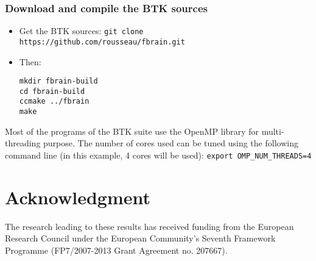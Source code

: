\documentclass[a4paper,10pt]{article}
\begin{document}
\subsubsection{Download and compile the BTK sources}
\begin{itemize}
 \item Get the BTK sources: \texttt{git clone https://github.com/rousseau/fbrain.git }
 \item Then:
\begin{verbatim}
mkdir fbrain-build
cd fbrain-build
ccmake ../fbrain
make
\end{verbatim}
\end{itemize}

Most of the programs of the BTK suite use the OpenMP library for multi-threading
purpose. The number of cores used can be tuned using the following command line
(in this example, 4 cores will be used): \texttt{export OMP\_NUM\_THREADS=4}




\section*{Acknowledgment}
\small{The research leading to these results has received funding from the
European Research Council under the European Community’s Seventh Framework
Programme (FP7/2007-2013 Grant Agreement no. 207667).}



\end{document}
